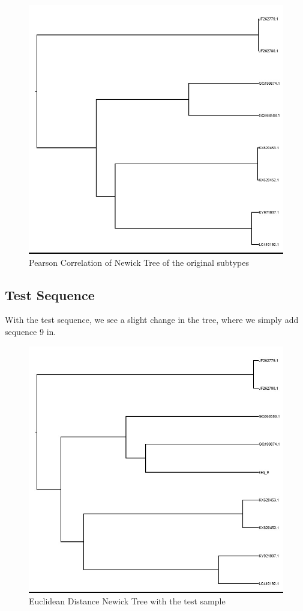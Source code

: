 \documentclass[10pt]{article}
\begin{document}
\begin{figure}[htbp]
    \centering
    \includegraphics[width=\textwidth]{figures/pearson_original.jpeg}
    \caption{Pearson Correlation of Newick Tree of the original subtypes}
\end{figure}
\newpage

\subsection*{Test Sequence}
With the test sequence, we see a slight change in the tree, where we simply add sequence 9 in.

\begin{figure}[htbp]
  \centering
    \includegraphics[width=\textwidth]{figures/euclidean_candidate.jpeg}
    \caption{Euclidean Distance Newick Tree with the test sample}
\end{figure}
\end{document}
